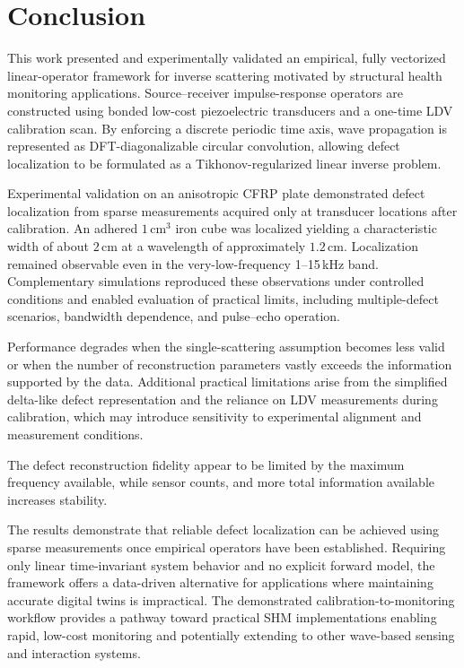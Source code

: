 \documentclass[a4paper,fleqn]{cas-sc}
\begin{document}
\section{Conclusion}\label{Conclusion}

This work presented and experimentally validated an empirical, fully vectorized linear-operator framework for inverse scattering motivated by structural health monitoring applications. Source–receiver impulse-response operators are constructed using bonded low-cost piezoelectric transducers and a one-time LDV calibration scan. By enforcing a discrete periodic time axis, wave propagation is represented as DFT-diagonalizable circular convolution, allowing defect localization to be formulated as a Tikhonov-regularized linear inverse problem.

Experimental validation on an anisotropic CFRP plate demonstrated defect localization from sparse measurements acquired only at transducer locations after calibration. An adhered $1\,\mathrm{cm}^3$ iron cube was localized yielding a characteristic width of about $2\,\mathrm{cm}$ at a wavelength of approximately $1.2\,\mathrm{cm}$. Localization remained observable even in the very-low-frequency 1--15\,kHz band. Complementary simulations reproduced these observations under controlled conditions and enabled evaluation of practical limits, including multiple-defect scenarios, bandwidth dependence, and pulse–echo operation.

Performance degrades when the single-scattering assumption becomes less valid or when the number of reconstruction parameters vastly exceeds the information supported by the data. Additional practical limitations arise from the simplified delta-like defect representation and the reliance on LDV measurements during calibration, which may introduce sensitivity to experimental alignment and measurement conditions.

The defect reconstruction fidelity appear to be limited by the maximum frequency available, while sensor counts, and more total information available increases stability. 

The results demonstrate that reliable defect localization can be achieved using sparse measurements once empirical operators have been established. Requiring only linear time-invariant system behavior and no explicit forward model, the framework offers a data-driven alternative for applications where maintaining accurate digital twins is impractical. The demonstrated calibration-to-monitoring workflow provides a pathway toward practical SHM implementations enabling rapid, low-cost monitoring and potentially extending to other wave-based sensing and interaction systems.
\end{document}
